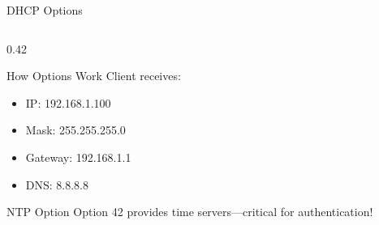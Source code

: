 \documentclass[aspectratio=169, 11pt]{beamer}
\begin{document}
\begin{frame}{DHCP Options}
\begin{columns}[T]
\begin{column}{0.42\textwidth}
\begin{block}{How Options Work}
                \vspace{0.2em}
                Client receives:
                \begin{itemize}\setlength{\itemsep}{1pt}
                    \item IP: 192.168.1.100
                    \item Mask: 255.255.255.0
                    \item Gateway: 192.168.1.1
                    \item DNS: 8.8.8.8
                \end{itemize}
            \end{block}
            
            \vspace{0.2em}
            \begin{alertblock}{NTP Option}
                \small
                Option 42 provides time servers---critical for authentication!
            \end{alertblock}
        \end{column}
    \end{columns}
\end{frame}
\end{document}
